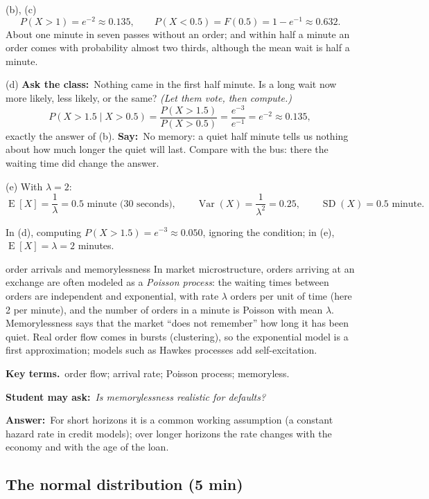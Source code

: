 \documentclass[11pt,a4paper,parskip=half]{scrartcl}
\renewcommand{\needspace}[1]{\Needspace{6\baselineskip}}
\newcommand{\E}{\operatorname{E}}
\newcommand{\Var}{\operatorname{Var}}
\newcommand{\SD}{\operatorname{SD}}
\newcommand{\terms}{\par\textbf{\color{plum}Key terms.}\ }
\newcommand{\sq}[1]{\par\textbf{\color{plum}Student may ask:}\ \emph{#1}\par}
\newcommand{\ans}{\textbf{Answer:}\ }
\newcommand{\say}{\textbf{\color{teal}Say:}\ }
\newcommand{\ask}{\textbf{\color{navy}Ask the class:}\ }
\begin{document}
(b), (c)
\[ P(X>1)=e^{-2}\approx0.135,\qquad P(X<0.5)=F(0.5)=1-e^{-1}\approx0.632. \]
About one minute in seven passes without an order; and within half a
minute an order comes with probability almost two thirds, although the
mean wait is half a minute.

(d) \ask Nothing came in the first half minute. Is a long wait now more
likely, less likely, or the same? \emph{(Let them vote, then compute.)}
\[ P(X>1.5\mid X>0.5)=\frac{P(X>1.5)}{P(X>0.5)}=\frac{e^{-3}}{e^{-1}}
	=e^{-2}\approx0.135, \]
exactly the answer of (b). \say No memory: a quiet half minute tells us
nothing about how much longer the quiet will last. Compare with the bus:
there the waiting time did change the answer.

(e) With $\lambda=2$:
\[ \E[X]=\frac1\lambda=0.5\text{ minute (30 seconds)},\qquad
	\Var(X)=\frac1{\lambda^2}=0.25,\qquad \SD(X)=0.5\text{ minute}. \]

\begin{mistake}
	In (d), computing $P(X>1.5)=e^{-3}\approx0.050$, ignoring the condition;
	in (e), $\E[X]=\lambda=2$ minutes.
\end{mistake}

\begin{bg}{order arrivals and memorylessness}
	In market microstructure, orders arriving at an exchange are often
	modeled as a \emph{Poisson process}: the waiting times between orders
	are independent and exponential, with rate $\lambda$ orders per unit of
	time (here 2 per minute), and the number of orders in a minute is
	Poisson with mean $\lambda$. Memorylessness says that the market ``does
	not remember'' how long it has been quiet. Real order flow comes in
	bursts (clustering), so the exponential model is a first approximation;
	models such as Hawkes processes add self-excitation.

	\terms order flow; arrival rate; Poisson process; memoryless.

	\sq{Is memorylessness realistic for defaults?}
	\ans For short horizons it is a common working assumption (a constant
	hazard rate in credit models); over longer horizons the rate changes
	with the economy and with the age of the loan.
\end{bg}

\needspace{0.45\textheight}
\subsection{The normal distribution (5 min)}
\end{document}
